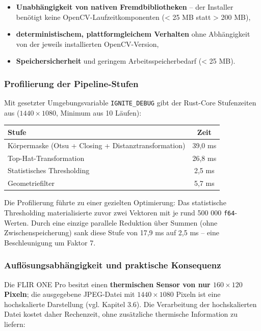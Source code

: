 \documentclass[
  11pt,
]{article}
\newcounter{none} %
\providecommand{\tightlist}{%
  \setlength{\itemsep}{0pt}\setlength{\parskip}{0pt}}
\begin{document}
\begin{itemize}
\tightlist
\item
  \textbf{Unabhängigkeit von nativen Fremdbibliotheken} -- der Installer
  benötigt keine OpenCV-Laufzeitkomponenten (\textless{} 25 MB statt
  \textgreater{} 200 MB),
\item
  \textbf{deterministischem, plattformgleichem Verhalten} ohne
  Abhängigkeit von der jeweils installierten OpenCV-Version,
\item
  \textbf{Speichersicherheit} und geringem Arbeitsspeicherbedarf
  (\textless{} 25 MB).
\end{itemize}

\subsubsection{Profilierung der
Pipeline-Stufen}\label{profilierung-der-pipeline-stufen}

Mit gesetzter Umgebungsvariable \texttt{IGNITE\_DEBUG} gibt der
Rust-Core Stufenzeiten aus (\(1440 \times 1080\), Minimum aus 10
Läufen):

{\def\LTcaptype{none} %
\begin{longtable}[]{@{}lc@{}}
\toprule\noalign{}
Stufe & Zeit \\
\midrule\noalign{}
\endhead
\bottomrule\noalign{}
\endlastfoot
Körpermaske (Otsu + Closing + Distanztransformation) & 39,0 ms \\
Top-Hat-Transformation & 26,8 ms \\
Statistisches Thresholding & 2,5 ms \\
Geometriefilter & 5,7 ms \\
\end{longtable}
}

Die Profilierung führte zu einer gezielten Optimierung: Das statistische
Thresholding materialisierte zuvor zwei Vektoren mit je rund 500 000
\texttt{f64}-Werten. Durch eine einzige parallele Reduktion über Summen
(ohne Zwischenspeicherung) sank diese Stufe von 17,9 ms auf 2,5 ms --
eine Beschleunigung um Faktor 7.

\subsubsection{Auflösungsabhängigkeit und praktische
Konsequenz}\label{aufluxf6sungsabhuxe4ngigkeit-und-praktische-konsequenz}

Die FLIR ONE Pro besitzt einen \textbf{thermischen Sensor von nur
\(160 \times 120\) Pixeln}; die ausgegebene JPEG-Datei mit
\(1440 \times 1080\) Pixeln ist eine hochskalierte Darstellung (vgl.
Kapitel 3.6). Die Verarbeitung der hochskalierten Datei kostet daher
Rechenzeit, ohne zusätzliche thermische Information zu liefern:
\end{document}
